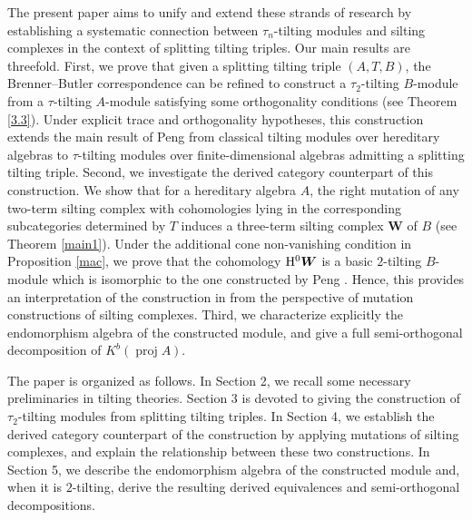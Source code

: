 \documentclass[reqno,12pt]{amsart}
\numberwithin{equation}{section}
\theoremstyle{plain}
\theoremstyle{definition}
\begin{document}
The present paper aims to unify and extend these strands of research by establishing a systematic connection between
$\tau_n$-tilting modules and silting complexes in the context of splitting tilting triples. Our main results are threefold. First, we prove that given a splitting tilting triple $(A,T,B)$, the Brenner--Butler correspondence can be refined to construct a $\tau_{2}$-tilting $B$-module from a
$\tau$-tilting $A$-module satisfying some orthogonality conditions (see Theorem \ref{3.3}). Under explicit trace and orthogonality hypotheses, this construction extends the main result of Peng \cite{PENG} from classical tilting modules over hereditary algebras to $\tau$-tilting modules over finite-dimensional algebras admitting a splitting tilting triple.
Second, we investigate the derived category counterpart of this construction. We show that for a hereditary algebra
$A$, the right mutation of any two-term silting complex with cohomologies lying in the corresponding subcategories determined by $T$ induces
a three-term silting complex $\boldsymbol{W}$ of $B$ (see Theorem \ref{main1}).
Under the additional cone non-vanishing condition in Proposition \ref{mac}, we prove that the cohomology ${\rm H}^0\boldsymbol{W}$ is a basic $2$-tilting $B$-module which is isomorphic to the one constructed by Peng \cite{PENG}. Hence, this provides
an interpretation of the construction in \cite{PENG} from the perspective of mutation constructions of silting complexes.
Third, we characterize explicitly the endomorphism algebra of the constructed module, and give a full semi-orthogonal decomposition of
$K^b(\operatorname{proj}A)$.



The paper is organized as follows. In Section 2, we recall some necessary preliminaries in tilting theories.
Section 3 is devoted to giving the construction of $\tau_2$-tilting modules from splitting tilting triples. In Section 4, we establish the derived category counterpart of the construction by applying mutations of silting complexes, and explain the relationship between these two constructions.
In Section 5, we describe the endomorphism algebra of the constructed module
and, when it is $2$-tilting, derive the resulting derived equivalences and
semi-orthogonal decompositions.
\end{document}
